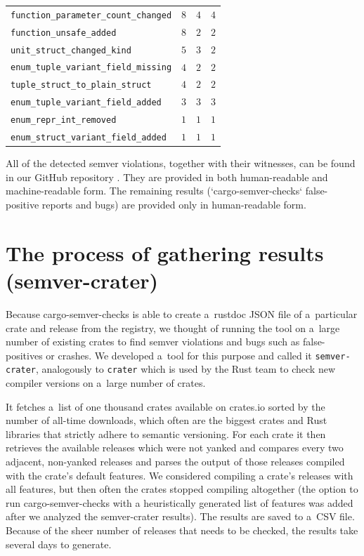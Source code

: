 \documentclass[licencjacka,en]{pracamgr}
\newcommand\Bspace{\rule[-0.9ex]{0pt}{0pt}}   %
\begin{document}
\begin{center}
\begin{longtable}{| p{7.75cm} | p{1.975cm} | p{1.975cm} | p{1.975cm} |}
			\texttt{function\_parameter\_count\_changed} & $8$ & $4$ & $4$ \\
			\texttt{function\_unsafe\_added} & $8$ & $2$ & $2$ \\
			\texttt{unit\_struct\_changed\_kind} & $5$ & $3$ & $2$ \\
			\texttt{enum\_tuple\_variant\_field\_missing} & $4$ & $2$ & $2$ \\
			\texttt{tuple\_struct\_to\_plain\_struct} & $4$ & $2$ & $2$ \\
			\texttt{enum\_tuple\_variant\_field\_added} & $3$ & $3$ & $3$ \\
			\texttt{enum\_repr\_int\_removed} & $1$ & $1$ & $1$ \\
			\texttt{enum\_struct\_variant\_field\_added} & $1$ & $1$ & $1$ \Bspace \\
		\hline
	\end{longtable}
\end{center}

All of the detected semver violations, together with their witnesses, can be found in our
GitHub repository \cite{github-csv-results}. They are provided in both human-readable
and machine-readable form. The remaining results (`cargo-semver-checks` false-positive reports
and bugs) are provided only in human-readable form.

\section{The process of gathering results (semver-crater)}\label{r:section_results_semver_crater}

Because cargo-semver-checks is able to create a~rustdoc JSON file
of a~particular crate and release from the registry,
we thought of running the tool on a~large number of existing crates
to find semver violations and bugs such as false-positives or crashes.
We developed a~tool for this purpose and called it \texttt{semver-crater},
analogously to \texttt{crater} which is used by the Rust team to check
new compiler versions on a~large number of crates.

It fetches a~list of one thousand crates available on crates.io sorted by the number of
all-time downloads, which often are the biggest crates and Rust libraries
that strictly adhere to semantic versioning. For each crate
it then retrieves the available releases which were not yanked
and compares every two adjacent, non-yanked releases and parses the 
output of those releases compiled with the crate's default features.
We considered compiling a crate's releases with all features,
but then often the crates stopped compiling altogether
(the option to run cargo-semver-checks with a heuristically generated list of features
was added after we analyzed the semver-crater results).
The results are saved to a~CSV file.
Because of the sheer number of releases that needs to be checked, the results take several days
to generate.
\end{document}
